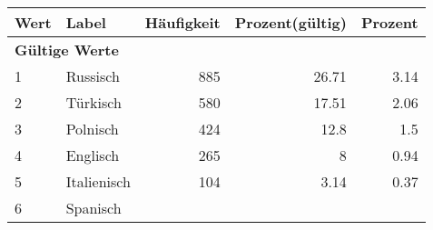     \begin{longtable}{lXrrr}
     \toprule
     \textbf{Wert} & \textbf{Label} & \textbf{Häufigkeit} & \textbf{Prozent(gültig)} & \textbf{Prozent} \\
     \endhead
     \midrule
     \multicolumn{5}{l}{\textbf{Gültige Werte}}\\

     1 &
     \multicolumn{1}{X}{ Russisch   } &


       \num{885} &
       \num[round-mode=places,round-precision=2]{26,71} &
         \num[round-mode=places,round-precision=2]{3,14} \\

     2 &
     \multicolumn{1}{X}{ Türkisch   } &


       \num{580} &
       \num[round-mode=places,round-precision=2]{17,51} &
         \num[round-mode=places,round-precision=2]{2,06} \\

     3 &
     \multicolumn{1}{X}{ Polnisch   } &


       \num{424} &
       \num[round-mode=places,round-precision=2]{12,8} &
         \num[round-mode=places,round-precision=2]{1,5} \\

     4 &
     \multicolumn{1}{X}{ Englisch   } &


       \num{265} &
       \num[round-mode=places,round-precision=2]{8} &
         \num[round-mode=places,round-precision=2]{0,94} \\

     5 &
     \multicolumn{1}{X}{ Italienisch   } &


       \num{104} &
       \num[round-mode=places,round-precision=2]{3,14} &
         \num[round-mode=places,round-precision=2]{0,37} \\

     6 &
     \multicolumn{1}{X}{ Spanisch   } &



\end{longtable}
